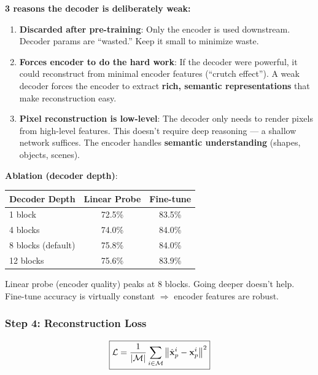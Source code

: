 \begin{keybox}
\textbf{3 reasons the decoder is deliberately weak:}
\begin{enumerate}
\item \textbf{Discarded after pre-training}: Only the encoder is used downstream. Decoder params are ``wasted.'' Keep it small to minimize waste.
\item \textbf{Forces encoder to do the hard work}: If the decoder were powerful, it could reconstruct from minimal encoder features (``crutch effect''). A weak decoder forces the encoder to extract \textbf{rich, semantic representations} that make reconstruction easy.
\item \textbf{Pixel reconstruction is low-level}: The decoder only needs to render pixels from high-level features. This doesn't require deep reasoning — a shallow network suffices. The encoder handles \textbf{semantic understanding} (shapes, objects, scenes).
\end{enumerate}

\textbf{Ablation (decoder depth)}:
\begin{center}\small
\begin{tabular}{lcc}\toprule
Decoder Depth & Linear Probe & Fine-tune \\\midrule
1 block & 72.5\% & 83.5\% \\
4 blocks & 74.0\% & 84.0\% \\
8 blocks (default) & 75.8\% & 84.0\% \\
12 blocks & 75.6\% & 83.9\% \\
\bottomrule
\end{tabular}
\end{center}
Linear probe (encoder quality) peaks at 8 blocks. Going deeper doesn't help. Fine-tune accuracy is virtually constant $\Rightarrow$ encoder features are robust.
\end{keybox}

\subsubsection{Step 4: Reconstruction Loss}
\begin{equation}\label{eq:mae_loss}
\boxed{\mathcal{L} = \frac{1}{|\mathcal{M}|}\sum_{i \in \mathcal{M}} \left\|\hat{\mathbf{x}}_p^i - \mathbf{x}_p^i\right\|^2}
\end{equation}

